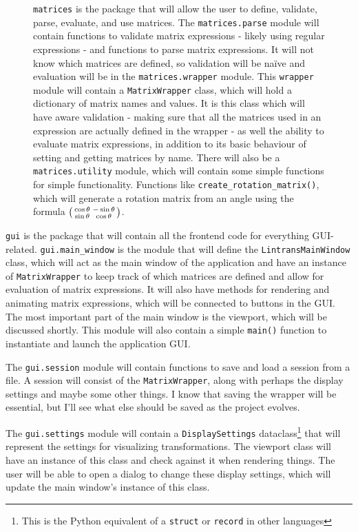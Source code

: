 \documentclass[../main.tex]{subfiles}
\begin{document}
\begin{figure}[H]
\begin{minipage}{0.55\linewidth}
\texttt{matrices} is the package that will allow the user to define, validate, parse, evaluate, and use matrices. The \texttt{matrices.parse} module will contain functions to validate matrix expressions - likely using regular expressions - and functions to parse matrix expressions. It will not know which matrices are defined, so validation will be na\"{i}ve and evaluation will be in the \texttt{matrices.wrapper} module. This \texttt{wrapper} module will contain a \texttt{MatrixWrapper} class, which will hold a dictionary of matrix names and values. It is this class which will have aware validation - making sure that all the matrices used in an expression are actually defined in the wrapper - as well the ability to evaluate matrix expressions, in addition to its basic behaviour of setting and getting matrices by name. There will also be a \texttt{matrices.utility} module, which will contain some simple functions for simple functionality. Functions like \texttt{create_rotation_matrix()}, which will generate a rotation matrix from an angle using the formula $\begin{psmallmatrix}\cos\theta & -\sin\theta\\\sin\theta & \cos\theta\end{psmallmatrix}$.
\end{minipage}
\end{figure}

\texttt{gui} is the package that will contain all the frontend code for everything GUI-related. \texttt{gui.main_window} is the module that will define the \texttt{LintransMainWindow} class, which will act as the main window of the application and have an instance of \texttt{MatrixWrapper} to keep track of which matrices are defined and allow for evaluation of matrix expressions. It will also have methods for rendering and animating matrix expressions, which will be connected to buttons in the GUI. The most important part of the main window is the viewport, which will be discussed shortly. This module will also contain a simple \texttt{main()} function to instantiate and launch the application GUI.

The \texttt{gui.session} module will contain functions to save and load a session from a file. A session will consist of the \texttt{MatrixWrapper}, along with perhaps the display settings and maybe some other things. I know that saving the wrapper will be essential, but I'll see what else should be saved as the project evolves.

The \texttt{gui.settings} module will contain a \texttt{DisplaySettings} dataclass\footnote{This is the Python equivalent of a \texttt{struct} or \texttt{record} in other languages} that will represent the settings for visualizing transformations. The viewport class will have an instance of this class and check against it when rendering things. The user will be able to open a dialog to change these display settings, which will update the main window's instance of this class.
\end{document}
